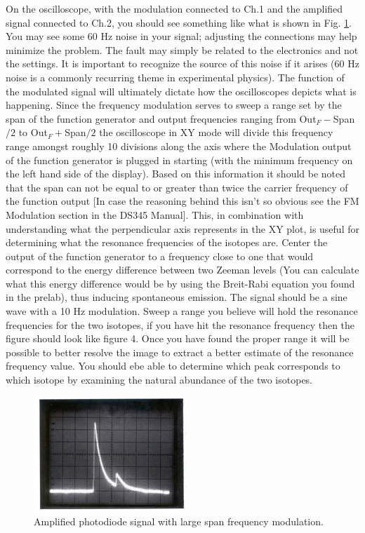 \documentclass[11pt]{article}
\begin{document}
On the oscilloscope, with the modulation connected to Ch.1 and the amplified signal connected to Ch.2, you should see something like what is shown in Fig. \ref{fig:funcgen_res}. You may see some 60 Hz noise in your signal; adjusting the connections may help minimize the problem. The fault may simply be related to the electronics and not the settings. It is important to recognize the source of this noise if it arises (60 Hz noise is a commonly recurring theme in experimental physics). The function of the modulated signal will ultimately dictate how the oscilloscopes depicts what is happening. Since the frequency modulation serves to sweep a range set by the span of the function generator and output frequencies ranging from Out$_F-$Span$/2$ to Out$_F+$Span$/2$ the oscilloscope in XY mode will divide this frequency range amongst roughly 10 divisions along the axis where the Modulation output of the function generator is plugged in starting (with the minimum frequency on the left hand side of the display). Based on this information it should be noted that the span can not be equal to or greater than twice the carrier frequency of the function output [In case the reasoning behind this isn't so obvious see the  FM Modulation section in the DS345 Manual]. This, in combination with understanding what the perpendicular axis represents in the XY plot, is useful for determining what the resonance frequencies of the isotopes are. Center the output of the function generator to a frequency close to one that would correspond to the energy difference between two Zeeman levels (You can calculate what this energy difference would be by using the Breit-Rabi equation you found in the prelab), thus inducing spontaneous emission. The signal should be a sine wave with a 10 Hz modulation. Sweep a range you believe will hold the resonance frequencies for the two isotopes, if you have hit the resonance frequency then the figure should look like figure 4. Once you have found the proper range it will be possible to better resolve the image to extract a better estimate of the resonance frequency value. You should ebe able to determine which peak corresponds to which isotope by examining the natural abundance of the two isotopes. 

\begin{figure}
\centering
\includegraphics{figures/OPTimage003.jpg}
\caption{Amplified photodiode signal with large span frequency modulation.}
\label{fig:funcgen_res}
\end{figure}
\end{document}
